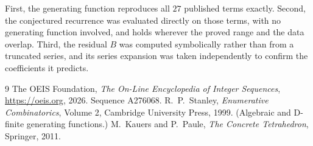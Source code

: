 \documentclass[11pt,a4paper]{article}
\theoremstyle{plain}
\theoremstyle{definition}
\begin{document}
First, the generating function reproduces all $27$ published terms exactly. Second,
the conjectured recurrence was evaluated directly on those terms, with no generating function
involved, and holds wherever the proved range and the data overlap. Third, the residual $B$ was
computed symbolically rather than from a truncated series, and its series expansion was taken
independently to confirm the coefficients it predicts.

\begin{thebibliography}{9}
 The OEIS Foundation, \emph{The On-Line Encyclopedia of Integer Sequences},
\url{https://oeis.org}, 2026. Sequence A276068.
 R.~P.~Stanley, \emph{Enumerative Combinatorics}, Volume 2, Cambridge
University Press, 1999. (Algebraic and D-finite generating functions.)
 M.~Kauers and P.~Paule, \emph{The Concrete Tetrahedron}, Springer, 2011.
\end{thebibliography}
\end{document}
